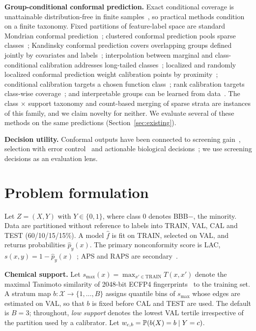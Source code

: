 \documentclass[10pt]{article}
\begin{document}
\textbf{Group-conditional conformal prediction.} Exact conditional coverage is unattainable distribution-free in finite samples~\cite{barber2021limits}, so practical methods condition on a finite taxonomy. Fixed partitions of feature-label space are standard Mondrian conformal prediction~\cite{vovk2005alrw,vovk2012conditional}; clustered conformal prediction pools sparse classes~\cite{ding2023clustered}; Kandinsky conformal prediction covers overlapping groups defined jointly by covariates and labels~\cite{bairaktari2025kandinsky}; interpolation between marginal and class-conditional calibration addresses long-tailed classes~\cite{ding2026longtail}; localized and randomly localized conformal prediction weight calibration points by proximity~\cite{guan2023lcp,hore2025rlcp}; conditional calibration targets a chosen function class~\cite{gibbs2025conditional}; rank calibration targets class-wise coverage~\cite{shi2024rc3p}; and interpretable groups can be learned from data~\cite{martinezgil2024groups}. The class $\times$ support taxonomy and count-based merging of sparse strata are instances of this family, and we claim novelty for neither. We evaluate several of these methods on the same predictions (Section~\ref{sec:existing}).

\textbf{Decision utility.} Conformal outputs have been connected to screening gain~\cite{svensson2018gain}, selection with error control~\cite{jin2023selection} and actionable biological decisions~\cite{corvelobenz2025amr}; we use screening decisions as an evaluation lens.

\section{Problem formulation}\label{sec:setup}
Let $Z=(X,Y)$ with $Y\in\{0,1\}$, where class $0$ denotes BBB$-$, the minority. Data are partitioned without reference to labels into TRAIN, VAL, CAL and TEST (60/10/15/15\%). A model $\hat f$ is fit on TRAIN, selected on VAL, and returns probabilities $\hat p_y(x)$. The primary nonconformity score is LAC, $s(x,y)=1-\hat p_y(x)$~\cite{sadinle2019lac}; APS and RAPS are secondary~\cite{romano2020aps,angelopoulos2021raps}.

\textbf{Chemical support.} Let $s_{\max}(x)=\max_{x'\in\mathrm{TRAIN}}T(x,x')$ denote the maximal Tanimoto similarity of 2048-bit ECFP4 fingerprints~\cite{rogers2010ecfp} to the training set. A stratum map $b:\mathcal X\to\{1,\dots,B\}$ assigns quantile bins of $s_{\max}$ whose edges are estimated on VAL, so that $b$ is fixed before CAL and TEST are used. The default is $B=3$; throughout, \emph{low support} denotes the lowest VAL tertile irrespective of the partition used by a calibrator. Let $w_{c,b}=\mathbb{P}(b(X)=b\mid Y=c)$.
\end{document}
